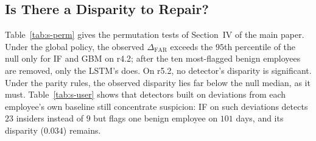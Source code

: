 \documentclass[10pt,onecolumn,letterpaper]{article}
\newcommand{\FAR}{\mathrm{FAR}}
\begin{document}
\begin{table}[!t]
\caption{Number and Sizes of Groups in r5.2 After Merging Groups Below 20 Employees Into ``Other''\label{tab:s-groups-r52}}
\centering
{}
\end{table}

\subsection{Is There a Disparity to Repair?}
Table~\ref{tab:s-perm} gives the permutation tests of Section~IV of the main paper. Under the global policy, the observed $\Delta_{\FAR}$ exceeds the $95$th percentile of the null only for IF and GBM on r4.2; after the ten most-flagged benign employees are removed, only the LSTM's does. On r5.2, no detector's disparity is significant. Under the parity rules, the observed disparity lies far below the null median, as it must. Table~\ref{tab:s-user} shows that detectors built on deviations from each employee's own baseline still concentrate suspicion: IF on such deviations detects $23$ insiders instead of $9$ but flags one benign employee on $101$ days, and its disparity ($0.034$) remains.
\end{document}
